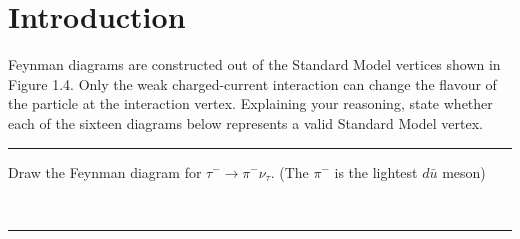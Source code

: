 \section{Introduction}

\begin{problem}{1.1}
Feynman diagrams are constructed out of the Standard Model vertices shown in Figure 1.4.
Only the weak charged-current interaction can change the flavour of the particle at the interaction vertex.
Explaining your reasoning, state whether each of the sixteen diagrams below represents a valid Standard Model vertex.
\end{problem}
\begin{solution}
    
\end{solution} 
\noindent\rule{7in}{1.5pt}
    
    

\begin{problem}{1.2}
Draw the Feynman diagram for $\tau^-\to\pi^-\nu_\tau$. (The $\pi^-$ is the lightest $d\bar{u}$ meson)
\end{problem}
\begin{solution} 
    \\[0.15in]
    \begin{center}
    \end{center}
\end{solution} 
\noindent\rule{7in}{1.5pt}

